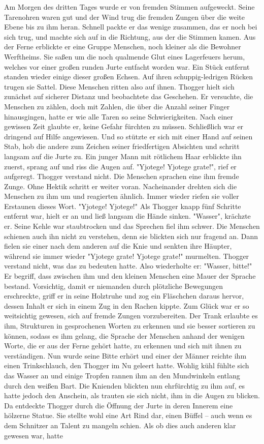 \documentclass[10pt, a4paper, oneside]{book}
\begin{document}
\begin{multicols}{2}
Am Morgen des dritten Tages wurde er von fremden Stimmen aufgeweckt. Seine Tarenohren waren gut und der Wind trug die fremden Zungen über die weite Ebene bis zu ihm heran. Schnell packte er das wenige zusammen, das er noch bei sich trug, und machte sich auf in die Richtung, aus der die Stimmen kamen. Aus der Ferne erblickte er eine Gruppe Menschen, noch kleiner als die Bewohner Werftheims. Sie saßen um die noch qualmende Glut eines Lagerfeuers herum, welches vor einer großen runden Jurte entfacht worden war. Ein Stück entfernt standen wieder einige dieser großen Echsen. Auf ihren schuppig-ledrigen Rücken trugen sie Sattel. Diese Menschen ritten also auf ihnen. Thogger hielt sich zunächst auf sicherer Distanz und beobachtete das Geschehen. Er versuchte, die Menschen zu zählen, doch mit Zahlen, die über die Anzahl seiner Finger hinausgingen, hatte er wie alle Taren so seine Schwierigkeiten. Nach einer gewissen Zeit glaubte er, keine Gefahr fürchten zu müssen. Schließlich war er dringend auf Hilfe angewiesen. Und so stützte er sich mit einer Hand auf seinen Stab, hob die andere zum Zeichen seiner friedfertigen Absichten und schritt langsam auf die Jurte zu. Ein junger Mann mit rötlichem Haar erblickte ihn zuerst, sprang auf und riss die Augen auf. "Yjotege! Yjotege grate!", rief er aufgeregt. Thogger verstand nicht. Die Menschen sprachen eine ihm fremde Zunge. Ohne Hektik schritt er weiter voran. Nacheinander drehten sich die Menschen zu ihm um und reagierten ähnlich. Immer wieder riefen sie voller Erstaunen dieses Wort. "Yjotege! Yjotege!" Als Thogger knapp fünf Schritte entfernt war, hielt er an und ließ langsam die Hände sinken. "Wasser", krächzte er. Seine Kehle war staubtrocken und das Sprechen fiel ihm schwer. Die Menschen schienen auch ihn nicht zu verstehen, denn sie blickten sich nur fragend an. Dann fielen sie einer nach dem anderen auf die Knie und senkten ihre Häupter, während sie immer wieder "Yjotege grate! Yjotege grate!" murmelten. Thogger verstand nicht, was das zu bedeuten hatte. Also wiederholte er: "Wasser, bitte!" Er begriff, dass zwischen ihm und den kleinen Menschen eine Mauer der Sprache bestand. Vorsichtig, damit er niemanden durch plötzliche Bewegungen erschreckte, griff er in seine Holztruhe und zog ein Fläschchen daraus hervor, dessen Inhalt er sich in einem Zug in den Rachen kippte. Zum Glück war er so weitsichtig gewesen, sich auf fremde Zungen vorzubereiten. Der Trank erlaubte es ihm, Strukturen in gesprochenen Worten zu erkennen und sie besser sortieren zu können, sodass es ihm gelang, die Sprache der Menschen anhand der wenigen Worte, die er aus der Ferne gehört hatte, zu erkennen und sich mit ihnen zu verständigen. Nun wurde seine Bitte erhört und einer der Männer reichte ihm einen Trinkschlauch, den Thogger im Nu geleert hatte. Wohlig kühl fühlte sich das Wasser an und einige Tropfen rannen ihm an den Mundwinkeln entlang durch den weißen Bart. Die Knienden blickten nun ehrfürchtig zu ihm auf, es hatte jedoch den Anschein, als trauten sie sich nicht, ihm in die Augen zu blicken. Da entdeckte Thogger durch die Öffnung der Jurte in deren Innerem eine hölzerne Statue. Sie stellte wohl eine Art Rind dar, einen Büffel – auch wenn es dem Schnitzer an Talent zu mangeln schien. Als ob dies auch anderen klar gewesen war, hatte 
\end{multicols}
\end{document}
